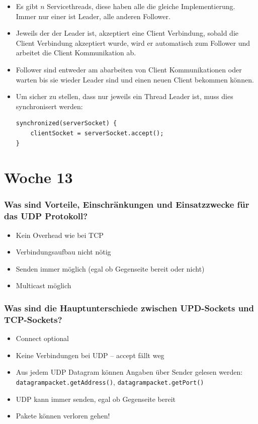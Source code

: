 \documentclass[10pt,a4paper]{scrartcl}
\begin{document}
\begin{itemize}
	\item Es gibt $n$ Servicethreads, diese haben alle die gleiche Implementierung. Immer nur einer
		ist Leader, alle anderen Follower.
	\item Jeweils der der Leader ist, akzeptiert eine Client Verbindung, sobald  die Client Verbindung
		akzeptiert wurde, wird er automatisch zum  Follower und arbeitet die Client Kommunikation ab.
	\item Follower sind entweder am abarbeiten von Client Kommunikationen oder  warten bis sie wieder
		Leader sind und einen neuen Client bekommen können.
	\item Um sicher zu stellen, dass nur jeweils ein Thread Leader ist, muss dies synchronisert werden:
\begin{verbatim}
synchronized(serverSocket) {
    clientSocket = serverSocket.accept();
}
\end{verbatim}
\end{itemize}
  
  
\section{Woche 13}

\subsubsection{Was sind Vorteile, Einschränkungen und Einsatzzwecke für das UDP Protokoll?}

\begin{itemize}
	\item Kein Overhead wie bei TCP
	\item Verbindungsaufbau nicht nötig 
	\item Senden immer möglich (egal ob Gegenseite bereit oder nicht)
	\item Multicast möglich
\end{itemize}

\subsubsection{Was sind die Hauptunterschiede zwischen UPD-Sockets und TCP-Sockets?}

\begin{itemize}
	\item Connect optional
	\item Keine Verbindungen bei UDP -- accept fällt weg
	\item Aus jedem UDP Datagram können Angaben über Sender gelesen werden:
		\texttt{datagrampacket.getAddress()}, \texttt{datagrampacket.getPort()}
	\item UDP kann immer senden, egal ob Gegenseite bereit
	\item Pakete können verloren gehen!
 \end{itemize}
\end{document}
